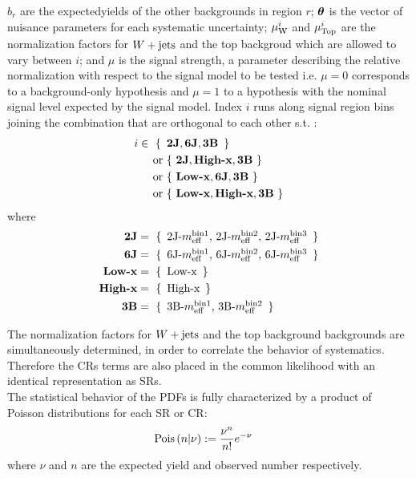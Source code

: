 $b_{r}$ are the expectedyields of the other backgrounds in region $r$;
$\bm{\theta}$ is the vector of nuisance parameters for each systematic uncertainty; 
$\mu_{\mathrm{W}}^i$ and $\mu_{\mathrm{Top}}^i$ are the normalization factors for $W+\mathrm{jets}$ and the top backgroud which are allowed to vary between $i$; 
and $\mu$ is the signal strength, a parameter describing the relative normalization with respect to the signal model to be tested i.e. $\mu=0$ corresponds to a background-only hypothesis and $\mu=1$ to a hypothesis with the nominal signal level expected by the signal model. Index $i$ runs along signal region bins joining the combination that are orthogonal to each other s.t. :
%
\begin{align}
i \in \,\, \{ \,\,\, & \textbf{2J},\textbf{6J},\textbf{3B}  \,\,\, \}  \nonumber \\
\mbox{ or } & \{ \,\, \textbf{2J},\textbf{High-x},\textbf{3B} \,\,\}  \nonumber \\
\mbox{ or } & \{ \,\, \textbf{Low-x},\textbf{6J},\textbf{3B} \,\,\}  \nonumber \\
\mbox{ or } & \{ \,\, \textbf{Low-x},\textbf{High-x},\textbf{3B} \,\,\}
\end{align}
where
\begin{align}
\textbf{2J} & = \,\, \{ \,\,\, \mbox{2J-$m_{\mathrm{eff}}^{\mathrm{bin 1}}$, 2J-$m_{\mathrm{eff}}^{\mathrm{bin 2}}$, 2J-$m_{\mathrm{eff}}^{\mathrm{bin 3}}$}  \,\,\, \}  \nonumber \\
\textbf{6J} & = \,\, \{ \,\,\, \mbox{6J-$m_{\mathrm{eff}}^{\mathrm{bin 1}}$, 6J-$m_{\mathrm{eff}}^{\mathrm{bin 2}}$, 6J-$m_{\mathrm{eff}}^{\mathrm{bin 3}}$}  \,\,\, \}  \nonumber \\
\textbf{Low-x} & = \,\, \{ \,\,\, \mbox{Low-x}  \,\,\, \}  \nonumber \\
\textbf{High-x} & = \,\, \{ \,\,\,\mbox{High-x}   \,\,\, \}  \nonumber \\
\textbf{3B} & = \,\, \{ \,\,\, \mbox{3B-$m_{\mathrm{eff}}^{\mathrm{bin 1}}$, 3B-$m_{\mathrm{eff}}^{\mathrm{bin 2}}$}  \,\,\, \}  \nonumber \\
\end{align}

The normalization factors for $W+\mathrm{jets}$ and the top background backgrounds are simultaneously determined,
in order to correlate the behavior of systematics.
Therefore the CRs terms are also placed in the common likelihood with an identical representation as SRs. \\

The statistical behavior of the PDFs is fully characterized by a product of Poisson distributions for each SR or CR:
\begin{align}
\mathrm{Pois}\,(n|\nu) & := \frac{\nu^n}{n!} e^{-\nu} \nonumber
\end{align}
where $\nu$ and $n$ are the expected yield and observed number respectively. \\

